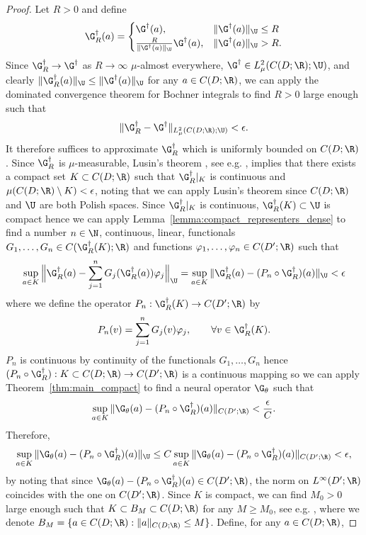 \begin{proof}
Let \(R > 0\) and define
\[
\G_R^\dagger(a) = \begin{cases}
\G^\dagger(a), & \|\G^\dagger(a)\|_\U \leq R \\
\frac{R}{\|\G^\dagger(a)\|_\U} \G^\dagger(a), & \|\G^\dagger(a)\|_\U > R.
\end{cases}
\]
Since \(\G^\dagger_R \to \G^\dagger\) as \(R \to \infty\) \(\mu\)-almost everywhere, \(\G^\dagger \in L^2_\mu(C(D;\R);\U)\), and clearly \(\|\G^\dagger_R(a)\|_{\U} \leq \|\G^\dagger (a)\|_{\U}\) for any \(a \in C(D;\R)\), we can apply the dominated convergence theorem for Bochner integrals to find \(R > 0\) large enough such that
\[\|\G^\dagger_R - \G^\dagger\|_{L^2_\mu (C(D;\R);\U)} < \epsilon.\]
It therefore suffices to approximate \(\G^\dagger_R\) which is uniformly bounded on \(C(D;\R)\). Since \(\G_R^\dagger\) is \(\mu\)-measurable, Lusin's theorem , see e.g. \cite[Theorem 1.0.0]{aaronson1997introduction}, implies that there exists a compact set \(K \subset C(D;\R)\) such that \(\G_R^\dagger|_K\) is continuous and \(\mu(C(D;\R) \setminus K) < \epsilon\), noting that we can apply Lusin's theorem since \(C(D;\R)\) and \(\U\) are both Polish spaces. 
Since \(\G^\dagger_R|_K\) is continuous, \(\G^\dagger_R(K) \subset \U\) is compact hence we can apply Lemma~\ref{lemma:compact_representers_dense} to find a number \(n \in \N\), continuous, linear, functionals \(G_1,\dots,G_n \in C(\G^\dagger_R(K);\R)\) and functions \(\varphi_1,\dots,\varphi_n \in C(D';\R)\) such that 
\[\sup_{a \in K} \Big\|\G^\dagger_R(a) - \sum_{j=1}^n G_j(\G^\dagger_R(a)) \varphi_j \Big\|_{\U}  = \sup_{a \in K} \|\G^\dagger_R(a) - (P_n \circ \G^\dagger_R)(a) \|_{\U} < \epsilon\]
where we define the operator \(P_n : \G^\dagger_R(K) \to C(D';\R)\) by
\[P_n(v) = \sum_{j=1}^n G_j(v) \varphi_j, \qquad \forall v \in \G^\dagger_R(K).\]
\(P_n\) is continuous by continuity of the functionals \(G_1,\dots,G_n\) hence \((P_n \circ \G^\dagger_R) : K \subset C(D;\R) \to C(D';\R)\) is a continuous mapping so we can apply Theorem~\ref{thm:main_compact} to find a neural operator \(\G_\theta\) such that
\[\sup_{a \in K} \|\G_\theta(a) - (P_n \circ \G^\dagger_R)(a)\|_{C(D';\R)} < \frac{\epsilon}{C}.\]
Therefore,
\[\sup_{a \in K} \|\G_\theta(a) - (P_n \circ \G^\dagger_R)(a)\|_{\U} \leq C \sup_{a \in K} \|\G_\theta(a) - (P_n \circ \G^\dagger_R)(a)\|_{C(D';\R)} < \epsilon, \]
by noting that since \(\G_\theta(a) - (P_n \circ \G^\dagger_R)(a) \in C(D';\R)\), the norm on \(L^\infty(D';\R)\) coincides with the one on \(C(D';\R)\).
Since \(K\) is compact, we can find \(M_0 > 0\) large enough such that \(K \subset B_M \subset C(D;\R)\) for any \(M \geq M_0\), see e.g. \cite[Theorem 1]{ward1974chebyshev}, where we denote \(B_M = \{a \in C(D;\R) : \|a\|_{C(D;\R)} \leq M\}\). Define, for any \(a \in C(D;\R)\),

\end{proof}
